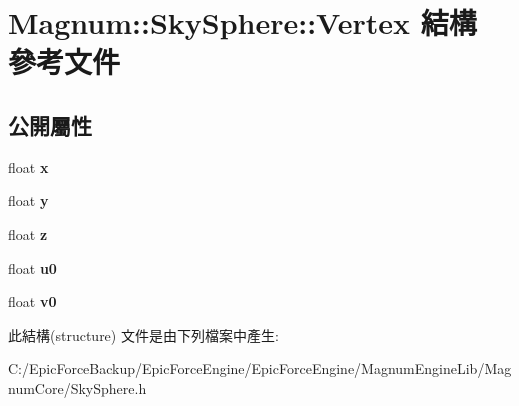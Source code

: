 \hypertarget{struct_magnum_1_1_sky_sphere_1_1_vertex}{}\section{Magnum\+:\+:Sky\+Sphere\+:\+:Vertex 結構 參考文件}
\label{struct_magnum_1_1_sky_sphere_1_1_vertex}
\subsection*{公開屬性}
\begin{DoxyCompactItemize}
\item 
float {\bfseries x}\hypertarget{struct_magnum_1_1_sky_sphere_1_1_vertex_a8022d641854087128fb9f99801f58af5}{}\label{struct_magnum_1_1_sky_sphere_1_1_vertex_a8022d641854087128fb9f99801f58af5}

\item 
float {\bfseries y}\hypertarget{struct_magnum_1_1_sky_sphere_1_1_vertex_aa3ef569c6215c93773ab49919d16adb7}{}\label{struct_magnum_1_1_sky_sphere_1_1_vertex_aa3ef569c6215c93773ab49919d16adb7}

\item 
float {\bfseries z}\hypertarget{struct_magnum_1_1_sky_sphere_1_1_vertex_a6a5821e0e6e4c26dc32df9554eba473d}{}\label{struct_magnum_1_1_sky_sphere_1_1_vertex_a6a5821e0e6e4c26dc32df9554eba473d}

\item 
float {\bfseries u0}\hypertarget{struct_magnum_1_1_sky_sphere_1_1_vertex_ac927a7277d5b42a34853cc02b65407f5}{}\label{struct_magnum_1_1_sky_sphere_1_1_vertex_ac927a7277d5b42a34853cc02b65407f5}

\item 
float {\bfseries v0}\hypertarget{struct_magnum_1_1_sky_sphere_1_1_vertex_ad3ca54dd5f6ba0aeea935bd075a053ed}{}\label{struct_magnum_1_1_sky_sphere_1_1_vertex_ad3ca54dd5f6ba0aeea935bd075a053ed}

\end{DoxyCompactItemize}


此結構(structure) 文件是由下列檔案中產生\+:\begin{DoxyCompactItemize}
\item 
C\+:/\+Epic\+Force\+Backup/\+Epic\+Force\+Engine/\+Epic\+Force\+Engine/\+Magnum\+Engine\+Lib/\+Magnum\+Core/Sky\+Sphere.\+h\end{DoxyCompactItemize}
